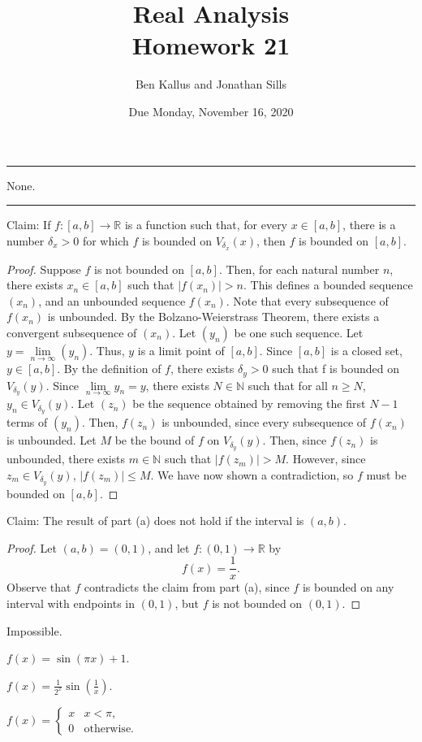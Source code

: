 \documentclass[12pt]{article}
\title{Real Analysis \\ Homework 21}
\author{Ben Kallus and Jonathan Sills}
\date{Due Monday, November 16, 2020}
\begin{document}
\pagecolor{black}
\color{white}
\maketitle

\hrule
\bigskip

 None.

\bigskip
\hrule
\bigskip


\medskip
{} Claim: If $f: [a,b] \to \mathbb R$ is a function such that, for every $x \in [a,b]$, there is a number $\delta_x>0$ for which $f$ is bounded on $V_{\delta_x}(x)$, then $f$ is bounded on $[a,b]$.
\begin{proof}
    Suppose $f$ is not bounded on $[a,b]$.
    Then, for each natural number $n$, there exists $x_n \in [a,b]$ such that $|f(x_n)| > n$.
    This defines a bounded sequence $(x_n)$, and an unbounded sequence $f(x_n)$.
    Note that every subsequence of $f(x_n)$ is unbounded.
    By the Bolzano-Weierstrass Theorem, there exists a convergent subsequence of $(x_n)$.
    Let $(y_n)$ be one such sequence.
    Let $y = \lim\limits_{n \to \infty}(y_n)$.
    Thus, $y$ is a limit point of $[a,b]$.
    Since $[a,b]$ is a closed set, $y \in [a,b]$.
    By the definition of $f$, there exists $\delta_y > 0$ such that f is bounded on $V_{\delta_y}(y)$.
    Since $\lim\limits_{n \to \infty} y_n = y$, there exists $N \in \mathbb N$ such that for all $n \geq N$, $y_n \in V_{\delta_y}(y)$.
    Let $(z_n)$ be the sequence obtained by removing the first $N-1$ terms of $(y_n)$.
    Then, $f(z_n)$ is unbounded, since every subsequence of $f(x_n)$ is unbounded.
    Let $M$ be the bound of $f$ on $V_{\delta_y}(y)$.
    Then, since $f(z_n)$ is unbounded, there exists $m \in \mathbb N$ such that $|f(z_m)| > M$.
    However, since $z_m \in V_{\delta_y}(y)$, $|f(z_m)| \leq M$.
    We have now shown a contradiction, so $f$ must be bounded on $[a,b]$.
\end{proof}

\medskip
{} Claim: The result of part (a) does not hold if the interval is $(a,b)$.
\begin{proof}
    Let $(a, b) = (0, 1)$, and let $f: (0, 1) \to \mathbb R$ by \[f(x) = \frac1x.\]
    Observe that $f$ contradicts the claim from part (a), since $f$ is bounded on any interval with endpoints in $(0,1)$, but $f$ is not bounded on $(0,1)$.
\end{proof}

\newpage
{}

\medskip
{} Impossible.

\medskip
{} $f(x) = \sin\left(\pi x\right) + 1$.

\medskip
{} $f(x) = \frac1{2^x}\sin(\frac1x)$.

\medskip
{} $f(x) = \begin{cases} x & x < \pi, \\ 0 & \text{otherwise.} \end{cases}$
\end{document}
